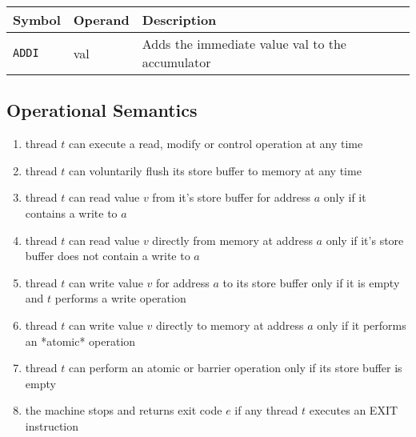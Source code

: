 \begin{tabular}{|l|l|l|}
  \hline
  \textbf{Symbol} & \textbf{Operand} & \textbf{Description} \\
  \hline
  \texttt{ADDI} & val & Adds the immediate value val to the accumulator \\
  \hline
\end{tabular}

\subsection{Operational Semantics}

\begin{enumerate}
  \item thread $t$ can execute a read, modify or control operation at any time
  \item thread $t$ can voluntarily flush its store buffer to memory at any time
  \item thread $t$ can read value $v$ from it's store buffer for address $a$ only if it contains a write to $a$
  \item thread $t$ can read value $v$ directly from memory at address $a$ only if it's store buffer does not contain a write to $a$
  \item thread $t$ can write value $v$ for address $a$ to its store buffer only if it is empty and $t$ performs a write operation
  \item thread $t$ can write value $v$ directly to memory at address $a$ only if it performs an *atomic* operation
  \item thread $t$ can perform an atomic or barrier operation only if its store buffer is empty
  \item the machine stops and returns exit code $e$ if any thread $t$ executes an EXIT instruction
\end{enumerate}
